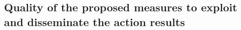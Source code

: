 \documentclass[a4paper,11pt]{article}
\begin{document}
\subsection{Quality of the proposed measures to exploit and disseminate the action results }

% 

\end{document}
